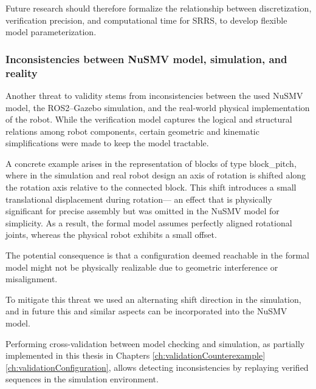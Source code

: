 Future research should therefore formalize the relationship between discretization,
verification precision, and computational time for SRRS,
to develop flexible model parameterization.

\subsubsection{Inconsistencies between NuSMV model, simulation, and reality}

Another threat to validity stems from inconsistencies between the 
used NuSMV model, the ROS2–Gazebo simulation, and the real-world physical implementation 
of the robot. 
While the verification model captures the logical and 
structural relations among robot components, certain geometric and kinematic 
simplifications were made to keep the model tractable.

A concrete example arises in the representation of blocks of type block\_pitch, 
where in the simulation and real robot design an axis of rotation  is 
shifted along the rotation axis relative to the connected block. 
This shift introduces a small translational displacement during rotation—
an effect that is physically significant for precise assembly but was 
omitted in the NuSMV model for simplicity. 
As a result, the formal model assumes perfectly aligned rotational joints,
whereas the physical robot exhibits a small offset.

The potential consequence is that a configuration deemed 
reachable in the formal model might not be physically realizable due 
to geometric interference or misalignment.

To mitigate this threat we used an alternating shift direction in the simulation, 
and in future this and similar aspects can be incorporated into the NuSMV model.

Performing cross-validation between model checking and simulation, 
as partially implemented in this thesis in Chapters \ref{ch:validationCounterexample}
\ref{ch:validationConfiguration},
allows detecting inconsistencies by replaying verified sequences 
in the simulation environment.


